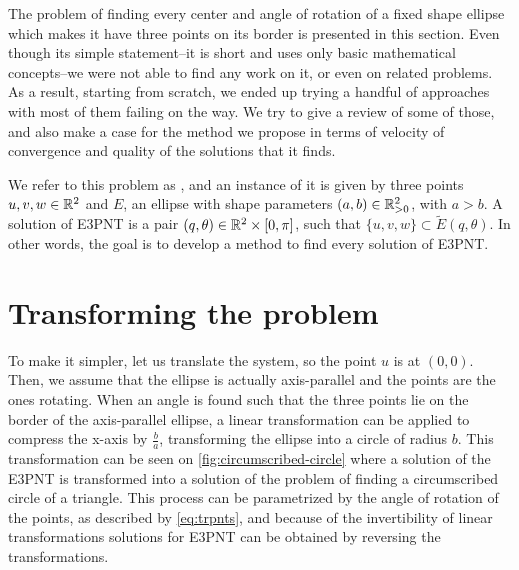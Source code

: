 The problem of finding every center and angle of rotation of a fixed shape ellipse which makes it have three points on its border is presented in this section. Even though its simple statement--it is short and uses only basic mathematical concepts--we were not able to find any work on it, or even on related problems. 
As a result, starting from scratch, we ended up trying a handful of approaches with most of them failing on the way. We try to give a review of some of those, and also make a case for the method we propose in terms of velocity of convergence and quality of the solutions that it finds.

We refer to this problem as , and an instance of it is given by three points $u, v, w \in \mathbb{R}^2$ and $E$, an ellipse with shape parameters $(a, b) \in \mathbb{R}^2_{>0}$, with $a > b$. A solution of E3PNT is a pair $(q, \theta) \in \mathbb{R}^2\times[0, \pi]$, such that $\{u, v, w\} \subset \tilde{E}(q, \theta)$. In other words, the goal is to develop a method to find every solution of E3PNT. 


\section{Transforming the problem}

To make it simpler, let us translate the system, so the point $u$ is at $(0,0)$. Then, we assume that the ellipse is actually axis-parallel and the points are the ones rotating. When an angle is found such that the three points lie on the border of the axis-parallel ellipse, a linear transformation can be applied to compress the x-axis by $\frac{b}{a}$, transforming the ellipse into a circle of radius $b$. This transformation can be seen on \autoref{fig:circumscribed-circle} where a solution of the E3PNT is transformed into a solution of the problem of finding a circumscribed circle of a triangle. 
This process can be parametrized by the angle of rotation of the points, as described by \autoref{eq:trpnts}, and because of the invertibility of linear transformations solutions for E3PNT can be obtained by reversing the transformations.

